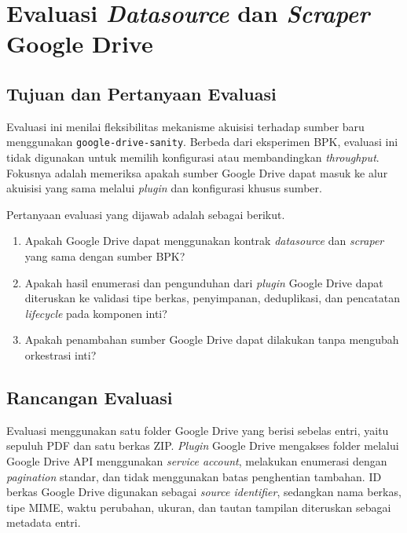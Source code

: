 \section{Evaluasi \textit{Datasource} dan \textit{Scraper} Google Drive}
\label{sec:evaluasi-datasource-scraper-google-drive}

\subsection{Tujuan dan Pertanyaan Evaluasi}
\label{sec:tujuan-evaluasi-google-drive}

Evaluasi ini menilai fleksibilitas mekanisme akuisisi terhadap sumber baru menggunakan \texttt{google-drive-sanity}.
Berbeda dari eksperimen BPK, evaluasi ini tidak digunakan untuk memilih konfigurasi atau membandingkan \textit{throughput}.
Fokusnya adalah memeriksa apakah sumber Google Drive dapat masuk ke alur akuisisi yang sama melalui \textit{plugin} dan konfigurasi khusus sumber.

Pertanyaan evaluasi yang dijawab adalah sebagai berikut.

\begin{enumerate}
  \item Apakah Google Drive dapat menggunakan kontrak \textit{datasource} dan \textit{scraper} yang sama dengan sumber BPK?
  \item Apakah hasil enumerasi dan pengunduhan dari \textit{plugin} Google Drive dapat diteruskan ke validasi tipe berkas, penyimpanan, deduplikasi, dan pencatatan \textit{lifecycle} pada komponen inti?
  \item Apakah penambahan sumber Google Drive dapat dilakukan tanpa mengubah orkestrasi inti?
\end{enumerate}

\subsection{Rancangan Evaluasi}
\label{sec:rancangan-evaluasi-google-drive}

Evaluasi menggunakan satu folder Google Drive yang berisi sebelas entri, yaitu sepuluh PDF dan satu berkas ZIP.
\textit{Plugin} Google Drive mengakses folder melalui Google Drive API menggunakan \textit{service account}, melakukan enumerasi dengan \textit{pagination} standar, dan tidak menggunakan batas penghentian tambahan.
ID berkas Google Drive digunakan sebagai \textit{source identifier}, sedangkan nama berkas, tipe MIME, waktu perubahan, ukuran, dan tautan tampilan diteruskan sebagai metadata entri.

